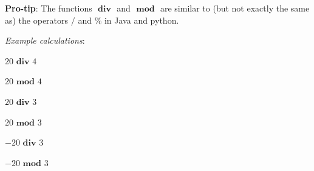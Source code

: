 \documentclass[12pt, oneside]{article}
\begin{document}
{\bf Pro-tip}: The functions $\textbf{ div }$ and $\textbf{ mod }$ are similar to (but not exactly the same as) 
the operators $/$ and $\%$ in Java and python.

\vfill

{\it Example calculations}:

$20 \textbf{ div } 4$

\vspace{20pt}

$20 \textbf{ mod } 4$

\vspace{20pt}

$20 \textbf{ div } 3$

\vspace{20pt}

$20 \textbf{ mod } 3$

\vspace{20pt}

$-20 \textbf{ div } 3$

\vspace{20pt}

$-20 \textbf{ mod } 3$

\vfill 
\end{document}
